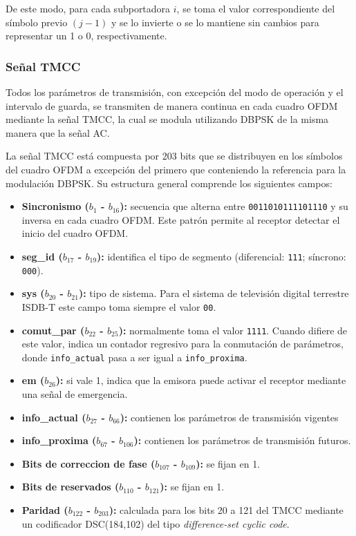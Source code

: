 De este modo, para cada subportadora \(i\), se toma el valor correspondiente del símbolo previo \((j-1)\) y se lo invierte o se lo mantiene sin cambios para representar un 1 o 0, respectivamente.

\subsubsection{Señal TMCC}


Todos los parámetros de transmisión, con excepción del modo de operación y el intervalo de guarda, se transmiten de manera continua en cada cuadro OFDM mediante la señal TMCC, la cual se modula utilizando DBPSK de la misma manera que la señal AC.

La señal TMCC está compuesta por 203 bits que se distribuyen en los símbolos del cuadro OFDM a excepción del primero que conteniendo la referencia para la modulación DBPSK. Su estructura general comprende los siguientes campos:

\begin{itemize}
\item \textbf{Sincronismo ($b_1$ - $b_{16}$):} secuencia que alterna entre \texttt{0011010111101110} y su inversa en cada cuadro OFDM. Este patrón permite al receptor detectar el inicio del cuadro OFDM.


\item \textbf{seg\_id ($b_{17}$ - $b_{19}$):} identifica el tipo de segmento (diferencial: \texttt{111}; síncrono: \texttt{000}).

\item \textbf{sys ($b_{20}$ - $b_{21}$):} tipo de sistema. Para el sistema de televisión digital terrestre ISDB-T este campo toma siempre el valor \texttt{00}.

\item \textbf{comut\_par ($b_{22}$ - $b_{25}$):} normalmente toma el valor \texttt{1111}. Cuando difiere de este valor, indica un contador regresivo para la conmutación de parámetros, donde \texttt{info\_actual} pasa a ser igual a \texttt{info\_proxima}.

\item \textbf{em ($b_{26}$):} si vale 1, indica que la emisora puede activar el receptor mediante una señal de emergencia.

\item \textbf{info\_actual ($b_{27}$ - $b_{66}$):} contienen los parámetros de transmisión vigentes

\item \textbf{info\_proxima ($b_{67}$ - $b_{106}$):}  contienen los parámetros de transmisión futuros.

\item \textbf{Bits de correccion de fase ($b_{107}$ - $b_{109}$):} se fijan en 1.

\item \textbf{Bits de reservados ($b_{110}$ - $b_{121}$):} se fijan en 1.


\item \textbf{Paridad ($b_{122}$ - $b_{203}$):} calculada para los bits 20 a 121 del TMCC mediante un codificador DSC(184,102) del tipo \textit{difference-set cyclic code}.
\end{itemize}

